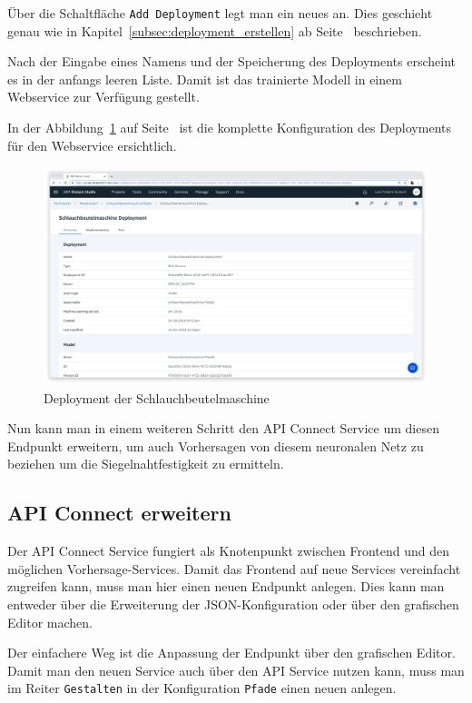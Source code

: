 Über die Schaltfläche \texttt{Add Deployment} legt man ein neues an. Dies geschieht genau wie in
Kapitel~\ref{subsec:deployment_erstellen} ab Seite~\pageref{subsec:deployment_erstellen} beschrieben.

Nach der Eingabe eines Namens und der Speicherung des Deployments erscheint es in der anfangs leeren Liste. Damit ist
das trainierte Modell in einem Webservice zur Verfügung gestellt.

In der Abbildung~\ref{fig:siegelmaschinen_deployment} auf Seite~\pageref{fig:siegelmaschinen_deployment} ist die
komplette Konfiguration des Deployments für den Webservice ersichtlich.

\begin{figure}[h]
    \centering
    \includegraphics[width=\textwidth]{images/kapitel_5/vffs_deployment.png}
    \caption{Deployment der Schlauchbeutelmaschine}
    \label{fig:siegelmaschinen_deployment}
\end{figure}

Nun kann man in einem weiteren Schritt den API Connect Service um diesen Endpunkt erweitern, um auch Vorhersagen von
diesem neuronalen Netz zu beziehen um die Siegelnahtfestigkeit zu ermitteln.

\subsection{API Connect erweitern}
Der API Connect Service fungiert als Knotenpunkt zwischen Frontend und den möglichen Vorhersage-Services. Damit das
Frontend auf neue Services vereinfacht zugreifen kann, muss man hier einen neuen Endpunkt anlegen. Dies kann man
entweder über die Erweiterung der JSON-Konfiguration oder über den grafischen Editor machen.

Der einfachere Weg ist die Anpassung der Endpunkt über den grafischen Editor. Damit man den neuen Service auch über den
API Service nutzen kann, muss man im Reiter \texttt{Gestalten} in der Konfiguration \texttt{Pfade} einen neuen anlegen.

